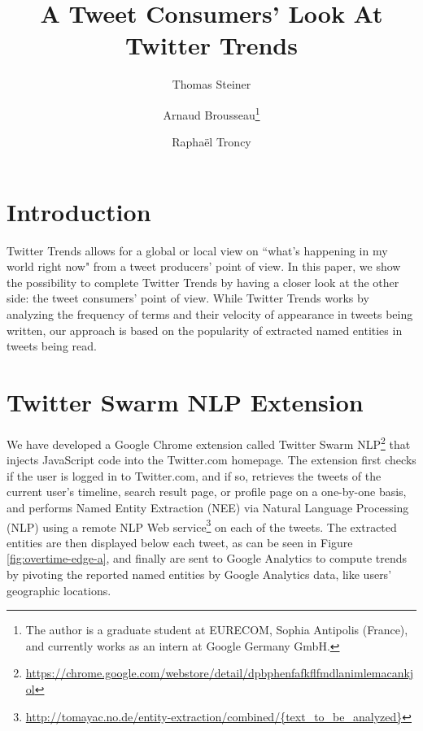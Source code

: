 \documentclass[runningheads,a4paper]{llncs}
\begin{document}
\mainmatter  %

\title{A Tweet Consumers' Look At Twitter Trends}


\author{Thomas Steiner \and Arnaud Brousseau\thanks{The author is a graduate student at EURECOM, Sophia Antipolis (France), and currently works as an intern at Google Germany GmbH.} \and Rapha\"{e}l Troncy}


\maketitle

\section{Introduction}\label{sec:introduction}
Twitter Trends allows for a global or local view on ``what's happening in my world right now" from a tweet producers' point of view. In this paper, we show the possibility to complete Twitter Trends by having a closer look at the other side: the tweet consumers' point of view. While Twitter Trends works by analyzing the frequency of terms and their velocity of appearance in tweets being written, our approach is based on the popularity of extracted named entities in tweets being read.
 
\section{Twitter Swarm NLP Extension}\label{sec:twitterswarm}
We have developed a Google Chrome extension called Twitter Swarm NLP\footnote{\url{https://chrome.google.com/webstore/detail/dpbphenfafkflfmdlanimlemacankjol}} that injects JavaScript code into the Twitter.com homepage. The extension first checks if the user is logged in to Twitter.com, and if so, retrieves the tweets of the current user's timeline, search result page, or profile page on a one-by-one basis, and performs Named Entity Extraction (NEE) via Natural Language Processing (NLP) using a remote NLP Web service\footnote{\url{http://tomayac.no.de/entity-extraction/combined/{text_to_be_analyzed}}} on each of the tweets. The extracted entities are then displayed below each tweet, as can be seen in Figure \ref{fig:overtime-edge-a}, and finally are sent to Google Analytics to compute trends by pivoting the reported named entities by Google Analytics data, like users' geographic locations.
\end{document}
